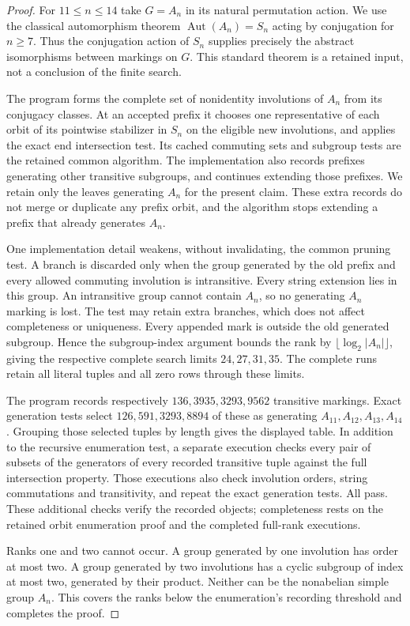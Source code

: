 \documentclass[11pt,a4paper]{article}
\begin{document}
\begin{proof}
For $11\le n\le14$ take $G=A_n$ in its natural permutation action.
We use the classical automorphism theorem
$\operatorname{Aut}(A_n)=S_n$ acting by conjugation for $n\ge7$.
Thus the conjugation action of $S_n$ supplies precisely the abstract
isomorphisms between markings on $G$. This standard theorem is a
retained input, not a conclusion of the finite search.

The program forms the complete set of nonidentity involutions of
$A_n$ from its conjugacy classes. At an accepted prefix it chooses
one representative of each orbit of its pointwise stabilizer in
$S_n$ on the eligible new involutions, and applies the exact end
intersection test. Its cached commuting sets and subgroup tests are
the retained common algorithm. The implementation also records
prefixes generating other transitive subgroups, and continues extending
those prefixes. We retain only the leaves generating $A_n$ for the
present claim. These extra records do not merge or duplicate any
prefix orbit, and the algorithm stops extending a prefix that already
generates $A_n$.

One implementation detail weakens, without invalidating, the common
pruning test. A branch is discarded only when the group generated by
the old prefix and every allowed commuting involution is intransitive.
Every string extension lies in this group. An intransitive group cannot
contain $A_n$, so no generating $A_n$ marking is lost. The test may
retain extra branches, which does not affect completeness or uniqueness.
Every appended mark is outside the old generated subgroup. Hence the
subgroup-index argument bounds the rank by
$\lfloor\log_2|A_n|\rfloor$, giving the respective complete search
limits $24,27,31,35$. The complete runs retain all literal tuples and
all zero rows through these limits.

The program records respectively $136,3935,3293,9562$ transitive
markings. Exact generation tests select $126,591,3293,8894$ of these
as generating $A_{11},A_{12},A_{13},A_{14}$. Grouping those selected
tuples by length gives the displayed table. In addition to the
recursive enumeration test, a separate execution checks every pair of
subsets of the generators of every recorded transitive tuple against
the full intersection property. Those executions also check involution
orders, string commutations and transitivity, and repeat the exact
generation tests. All pass. These additional checks verify the recorded
objects; completeness rests on the retained orbit enumeration proof and
the completed full-rank executions.

Ranks one and two cannot occur. A group generated by one involution
has order at most two. A group generated by two involutions has a cyclic
subgroup of index at most two, generated by their product. Neither can
be the nonabelian simple group $A_n$. This covers the ranks below the
enumeration's recording threshold and completes the proof.
\end{proof}
\end{document}
